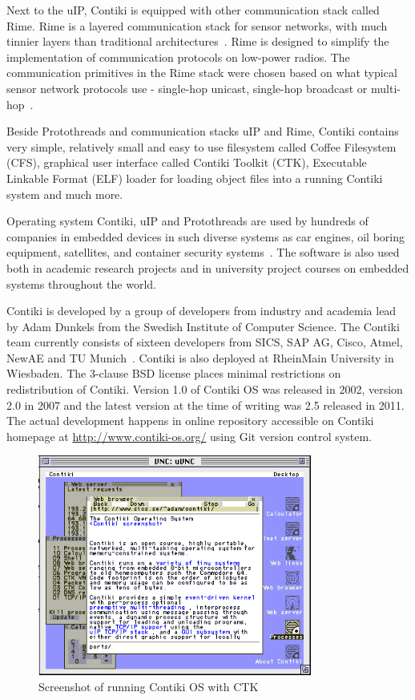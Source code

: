 Next to the uIP, Contiki is equipped with other communication stack called Rime.
Rime is a layered communication stack for sensor networks,
with much tinnier layers than traditional architectures~\cite{paper-rime}.
Rime is designed to simplify the implementation of communication
protocols on low-power radios.
The communication primitives in the Rime stack were chosen
based on what typical sensor network protocols use -
single-hop unicast, single-hop broadcast or multi-hop~\cite{contiki-docs,paper-rime}.

Beside Protothreads and communication stacks uIP and Rime,
Contiki contains very simple, relatively small and easy to use filesystem
called Coffee Filesystem (CFS),
graphical user interface called Contiki Toolkit (CTK),
Executable Linkable Format (ELF) loader for loading object files into a running Contiki system
and much more.

Operating system Contiki, uIP and Protothreads are used by hundreds of companies in embedded devices in
such diverse systems as car engines, oil boring equipment, satellites, and container security systems~\cite{thesis-programming}.
The software is also used both in academic research
projects and in university project courses on embedded systems throughout the
world.

Contiki is developed by a group of developers from industry and academia
lead by Adam Dunkels from the Swedish Institute of Computer Science.
The Contiki team currently consists of sixteen developers from SICS,
SAP AG, Cisco, Atmel, NewAE and TU Munich~\cite{contiki-docs}.
Contiki is also deployed at RheinMain University in Wiesbaden.
The 3-clause BSD license places minimal restrictions on redistribution of Contiki.
Version 1.0 of Contiki OS was released in 2002, version 2.0 in 2007 and the latest version
at the time of writing was 2.5 released in 2011.
The actual development happens in online repository accessible on Contiki homepage at \url{http://www.contiki-os.org/}
using Git version control system.

\begin{figure}
  \centering
  \includegraphics[width=9cm,keepaspectratio]{fig/contiki-vnc.png}
  \caption{Screenshot of running Contiki OS with CTK}
  \label{fig:contiki}
  \bigskip
\end{figure}









